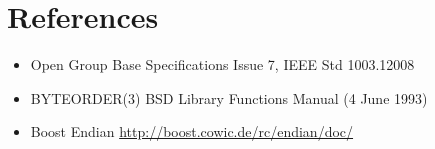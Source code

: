 \documentclass[12pt,twoside]{article}
\begin{document}
\section{References}
\begin{itemize}
    \item Open Group Base Specifications Issue 7, IEEE Std 1003.1\-­2008
    \item BYTEORDER(3) \- BSD Library Functions Manual (4 June 1993)
    \item Boost Endian \- \url{http://boost.cowic.de/rc/endian/doc/}
\end{itemize}
\end{document}
